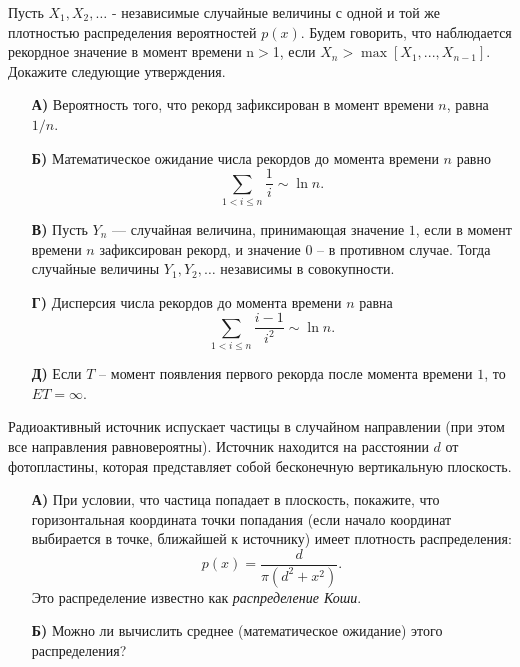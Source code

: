 \begin{problem}[рекорды]
Пусть $X_1 ,X_2 ,\ldots $ - независимые 
случайные величины с одной и той же плотностью распределения вероятностей 
$p(x)$. Будем говорить, что наблюдается рекордное значение в момент времени 
n$>$1, если $X_n >\max \left[ {X_1 ,...,X_{n-1} } \right]$. Докажите 
следующие утверждения.

\begin{enumerate}
\item[\textbf{А)}] Вероятность того, что рекорд зафиксирован в момент времени $n$, 
равна $1/n$.

\item[\textbf{Б)}] Математическое ожидание числа рекордов до момента времени $n$ 
равно 
\[
\sum\limits_{1<i\le n} {\frac{1}{i}} \sim \ln n.
\]

\item[\textbf{В)}] Пусть $Y_n $ --- случайная величина, принимающая значение $1$, если 
в момент времени $n$ зафиксирован рекорд, и значение $0$ -- в противном случае. 
Тогда случайные величины $Y_1 ,Y_2 ,\ldots$ независимы в совокупности.

\item[\textbf{Г)}] Дисперсия числа рекордов до момента времени $n$ равна
\[
\sum\limits_{1<i\le n} {\frac{i-1}{i^2}} \sim \ln n.
\]

\item[\textbf{Д)}] Если $T$ -- момент появления первого рекорда после момента времени $1$, то $ET=\infty $.
\end{enumerate}
\end{problem}

\begin{problem}
Радиоактивный источник испускает 
частицы в случайном направлении (при этом все направления равновероятны). 
Источник находится на расстоянии $d$ от фотопластины, которая представляет 
собой бесконечную вертикальную плоскость.

\begin{enumerate}
\item[\textbf{А)}] При условии, что частица попадает в плоскость, покажите, что 
горизонтальная координата точки попадания (если начало координат выбирается 
в точке, ближайшей к источнику) имеет плотность распределения:
\[
p\left( x \right)=\frac{d}{\pi \left( {d^2+x^2} \right)}.
\]
Это распределение известно как \textit{распределение Коши}.

\item[\textbf{Б)}] Можно ли вычислить среднее (математическое ожидание) этого 
распределения?
\end{enumerate}
\end{problem}

